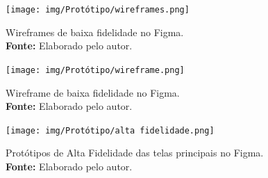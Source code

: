 \begin{figure}[H]
    \centering
    \begin{minipage}[b]{0.48\textwidth}
        \centering
        \texttt{[image: img/Protótipo/wireframes.png]}
        \caption{Wireframes de baixa fidelidade no Figma. \\
            \textbf{Fonte:} Elaborado pelo autor.}
        \label{fig:wireframes}
    \end{minipage}
    \hfill
    \begin{minipage}[b]{0.48\textwidth}
        \centering
        \texttt{[image: img/Protótipo/wireframe.png]}
        \caption{Wireframe de baixa fidelidade no Figma. \\
            \textbf{Fonte:} Elaborado pelo autor.}
        \label{fig:wireframe}
    \end{minipage}
\end{figure}

\begin{figure}[H]
    \centering
    \texttt{[image: img/Protótipo/alta fidelidade.png]}
    \caption{ Protótipos de Alta Fidelidade das telas principais no Figma. \\
        \textbf{Fonte:} Elaborado pelo autor.}
    \label{fig:prototipo_alta_fidelidade}
\end{figure}

